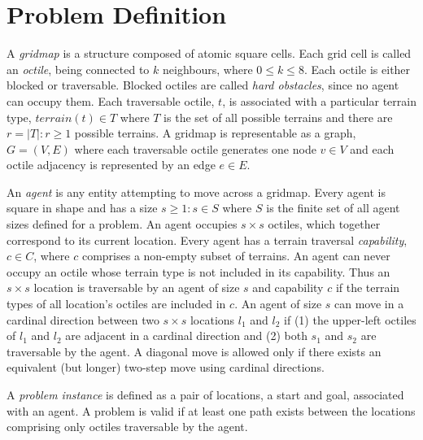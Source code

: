 \section{Problem Definition}
A \emph{gridmap} is a structure composed of atomic square cells.
Each grid cell is called an \emph{octile}, being connected to $k$ neighbours, where  $0 \leq k \leq 8$. 
Each octile is either blocked or traversable. 
Blocked octiles are called \emph{hard obstacles}, since no agent can occupy them.
Each traversable octile, $t$, is associated with a particular terrain type, $terrain(t) \in T$ where $T$ is the set of all possible terrains and there are $r = |T| : r \geq 1$ possible terrains.
A gridmap is representable as a graph, $G = (V, E)$ where each traversable octile generates one node $v \in V$ and each octile adjacency is represented by an edge $e \in E$.
\par \indent
An \emph{agent} is any entity attempting to move across a gridmap. 
Every agent is square in shape and has a size $s \geq 1 : s \in S$ where $S$ is the finite set of all agent sizes defined for a problem.
An agent occupies $s \times s$ octiles, which together correspond to its current location. 
Every agent has a terrain traversal \emph{capability}, $c \in C$, where $c$ comprises a non-empty subset of terrains.
An agent can never occupy an octile whose terrain type is not included in its capability.
Thus an $s \times s$ location is traversable by an agent of size $s$ and capability $c$ if the terrain types of all location's octiles are included in $c$.
An agent of size $s$ can move in a cardinal direction between two $s \times s$ locations $l_1$ and $l_2$ if (1) the upper-left octiles of $l_1$ and $l_2$ are adjacent in a cardinal direction and (2) both $s_1$ and $s_2$ are traversable by the agent.
A diagonal move is allowed only if there exists an equivalent (but longer) two-step move using cardinal directions.
%
%
\par \indent
A \emph{problem instance} is defined as a pair of locations, a start and goal, associated with an agent. A problem is valid if at least one path exists between the locations comprising only octiles traversable by the agent. 
